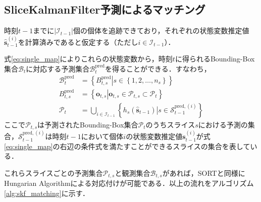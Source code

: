     \subsection{SliceKalmanFilter予測によるマッチング}
    時刻$t-1$までに$\left|\mathcal{I}_{t-1}\right|$個の個体を追跡できており，それぞれの状態変数推定値$\hat{\bm{s}}_{t-1}^{(i)}$を計算済みであると仮定する（ただし$i \in \mathcal{I}_{t-1}$）．
    \par
    式\ref{eq:single_map}によりこれらの状態変数から，時刻$t$に得られるBounding-Box集合$\mathcal{B}_t$に対応する予測集合$\mathcal{B}_t^{\text{pred}}$を得ることができる．すなわち，
    \begin{equation}
        \begin{aligned}
            \mathcal{B}_t^{\text{pred}} &= \left\{\left.B_{t,s}^{\text{pred}}\right|s \in \left\{1,2,\dots,n_s\right\}\right\}
            \\ B_{t,s}^{\text{pred}} &= \left\{\left.\bm{o}_{t,s}\right| \bm{o}_{t,s} \in \mathcal{P}_{t,s} \subset \mathcal{P}_t\right\}
            \\ \mathcal{P}_t &= \bigcup_{i \in \mathcal{I}_{t-1}} \left\{\left.h_s(\hat{\bm{s}}_{t-1})\right| s \in \mathcal{S}_{t-1}^{\text{pred},(i)}\right\}
        \end{aligned}
    \end{equation}
    ここで$\mathcal{P}_{t,s}$は予測されたBounding-Box集合$\mathcal{P}_t$のうちスライス$s$における予測の集合，$\mathcal{S}_{t-1}^{\text{pred},(i)}$は時刻$t-1$において個体$i$の状態変数推定値$\bm{s}_{t-1}^{(i)}$が式\ref{eq:single_map}の右辺の条件式を満たすことができるスライスの集合を表している．
    \par
    これらスライスごとの予測集合$\mathcal{P}_{t,s}$と観測集合$\mathcal{B}_{t,s}$があれば，SORTと同様にHungarian Algorithmによる対応付けが可能である．以上の流れをアルゴリズム\ref{alg:skf_matching}に示す．
